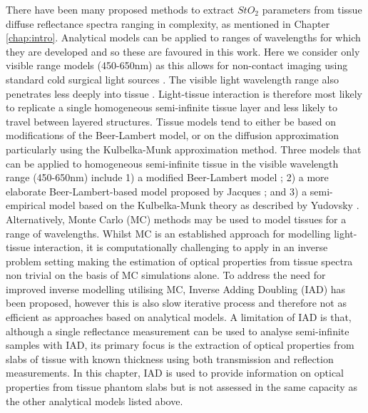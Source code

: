 There have been many proposed methods to extract $StO_2$ parameters from tissue diffuse reflectance spectra ranging in complexity, as mentioned in Chapter \ref{chap:intro}.
Analytical models can be applied to ranges of wavelengths for which they are developed and so these are favoured in this work. 
Here we consider only visible range models (450-650nm) as this allows for non-contact imaging using standard cold surgical light sources \cite{Clancy2011}.
The visible light wavelength range also penetrates less deeply into tissue \cite{Eggert1987, Sabino2016}. Light-tissue interaction is therefore most likely to replicate a single homogeneous semi-infinite tissue layer and less likely to travel between layered structures.
Tissue models tend to either be based on modifications of the Beer-Lambert model, or on the diffusion approximation particularly using the Kulbelka-Munk approximation method\cite{MacKenzie2018}. Three models that can be applied to homogeneous semi-infinite tissue in the visible wavelength range (450-650nm) include 1) a modified Beer-Lambert model \cite{Clancy2015}; 2) a more elaborate Beer-Lambert-based model proposed by Jacques \cite{Jacques1999}; and 3) a semi-empirical model based on the Kulbelka-Munk theory as described by Yudovsky \cite{Yudovsky2009}.
Alternatively, Monte Carlo (MC) methods may be used to model tissues for a range of wavelengths. Whilst MC is an established approach for modelling light-tissue interaction, it is computationally challenging to apply in an inverse problem setting making the estimation of optical properties from tissue spectra non trivial on the basis of MC simulations alone.
To address the need for improved inverse modelling utilising MC, Inverse Adding Doubling (IAD)\cite{Prahl2017} has been proposed, however this is also slow iterative process and therefore not as efficient as approaches based on analytical models.
A limitation of IAD is that, although a single reflectance measurement can be used to analyse semi-infinite samples with IAD, its primary focus is the extraction of optical properties from slabs of tissue with known thickness using both transmission and reflection measurements.
In this chapter, IAD is used to provide information on optical properties from tissue phantom slabs but is not assessed in the same capacity as the other 
analytical models listed above. 

